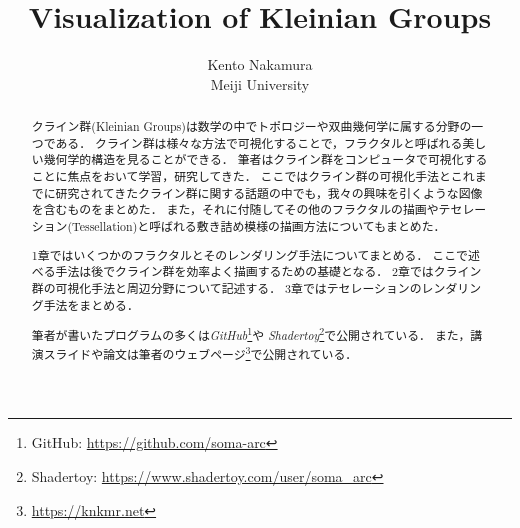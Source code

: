 \documentclass[uplatex, dvipdfmx]{jsarticle}
\title{ Visualization of Kleinian Groups }
\author{ Kento Nakamura\\
Meiji University\\
}
\date{}
\begin{document}
\maketitle

\begin{abstract}
クライン群(Kleinian Groups)は数学の中でトポロジーや双曲幾何学に属する分野の一つである．
クライン群は様々な方法で可視化することで，フラクタルと呼ばれる美しい幾何学的構造を見ることができる．
筆者はクライン群をコンピュータで可視化することに焦点をおいて学習，研究してきた．
ここではクライン群の可視化手法とこれまでに研究されてきたクライン群に関する話題の中でも，我々の興味を引くような図像を含むものをまとめた．
また，それに付随してその他のフラクタルの描画やテセレーション(Tessellation)と呼ばれる敷き詰め模様の描画方法についてもまとめた．

1章ではいくつかのフラクタルとそのレンダリング手法についてまとめる．
ここで述べる手法は後でクライン群を効率よく描画するための基礎となる．
2章ではクライン群の可視化手法と周辺分野について記述する．
3章ではテセレーションのレンダリング手法をまとめる．

筆者が書いたプログラムの多くは\textit{GitHub}\footnote{GitHub: \url{https://github.com/soma-arc}}や
\textit{Shadertoy}\footnote{Shadertoy: \url{https://www.shadertoy.com/user/soma\_arc}}で公開されている．
また，講演スライドや論文は筆者のウェブページ\footnote{\url{https://knkmr.net}}で公開されている．

\end{abstract}

\clearpage

\tableofcontents

\clearpage







\printbibliography
\end{document}
